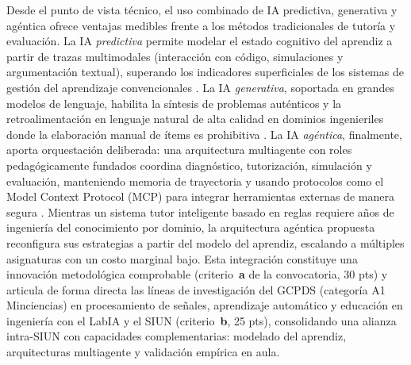  Desde el punto de vista técnico, el uso combinado de IA predictiva, generativa y agéntica ofrece ventajas medibles frente a los métodos tradicionales de tutoría y evaluación. La IA \emph{predictiva} permite modelar el estado cognitivo del aprendiz a partir de trazas multimodales (interacción con código, simulaciones y argumentación textual), superando los indicadores superficiales de los sistemas de gestión del aprendizaje convencionales \cite{hooshyar2024systematic}. La IA \emph{generativa}, soportada en grandes modelos de lenguaje, habilita la síntesis de problemas auténticos y la retroalimentación en lenguaje natural de alta calidad en dominios ingenieriles donde la elaboración manual de ítems es prohibitiva \cite{wang2024survey, park2023generative}. La IA \emph{agéntica}, finalmente, aporta orquestación deliberada: una arquitectura multiagente con roles pedagógicamente fundados coordina diagnóstico, tutorización, simulación y evaluación, manteniendo memoria de trayectoria y usando protocolos como el Model Context Protocol (MCP) para integrar herramientas externas de manera segura \cite{xi2023rise}. Mientras un sistema tutor inteligente basado en reglas requiere años de ingeniería del conocimiento por dominio, la arquitectura agéntica propuesta reconfigura sus estrategias a partir del modelo del aprendiz, escalando a múltiples asignaturas con un costo marginal bajo. Esta integración constituye una innovación metodológica comprobable (criterio~\textbf{a} de la convocatoria, 30 pts) y articula de forma directa las líneas de investigación del GCPDS (categoría A1 Minciencias) en procesamiento de señales, aprendizaje automático y educación en ingeniería con el LabIA y el SIUN (criterio~\textbf{b}, 25 pts), consolidando una alianza intra-SIUN con capacidades complementarias: modelado del aprendiz, arquitecturas multiagente y validación empírica en aula.


